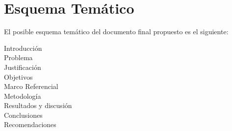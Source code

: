 \chapter{Esquema Tem\'atico}
\label{sec:esquema}
El posible esquema tem\'atico del documento final propuesto es el siguiente:

\begin{description}
\item[Introducci\'on]
\item[Problema]
\item[Justificaci\'on]
\item[Objetivos]
\item[Marco Referencial]
\item[Metodolog\'ia]
\item[Resultados y discusi\'on]
\item[Conclusiones]
\item[Recomendaciones]
\end{description}

\pagebreak